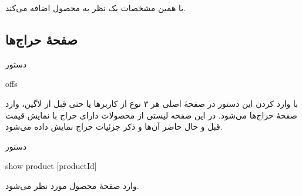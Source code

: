 \documentclass[]{article}
\begin{document}
با همین مشخصات یک نظر به محصول اضافه می‌کند.

\newpage

\subsection*{{\titr صفحهٔ حراج‌ها}}


\begin{mybox}[colback=yellow]{دستور}

\begin{latin}

offs

\end{latin}

\end{mybox}

با وارد کردن این دستور در صفحهٔ اصلی هر ۳ نوع از کاربرها یا حتی قبل از لاگین، وارد صفحهٔ حراج‌ها می‌شود. در این صفحه لیستی از محصولات دارای حراج با نمایش قیمت قبل و حال حاضر آن‌ها و ذکر جزئیات حراج نمایش داده می‌شود.


\hrulefill

\begin{mybox}[colback=yellow]{دستور}

\begin{latin}

show product [productId]

\end{latin}

\end{mybox}

وارد صفحهٔ محصول مورد نظر می‌شود.
\end{document}
